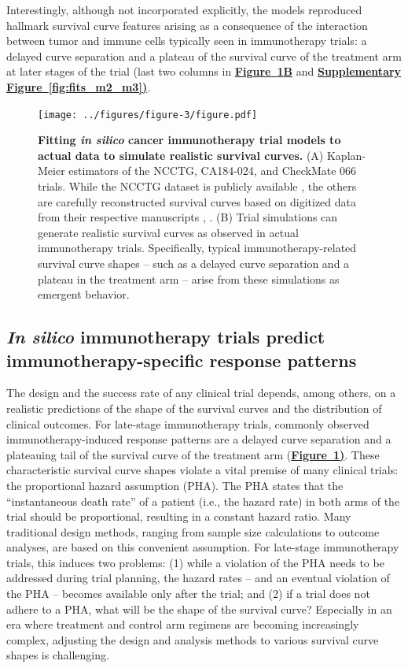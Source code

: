 \documentclass[a4paper,10pt]{article}
\newcommand{\myref}[2]{\hyperref[#1]{\bfseries Figure~\ref*{#1}#2}}
\newcommand{\mysupp}[2]{\hyperref[#1]{\bfseries Supplementary Figure~\ref*{#1}#2}}
\begin{document}
Interestingly, although not incorporated explicitly, the models reproduced hallmark survival
curve features arising as a consequence of the
interaction between tumor and immune cells typically seen in immunotherapy
trials: a delayed curve separation and a plateau of the survival curve of the
treatment arm at later stages of the trial 
(last two columns in \myref{fig:fig2}B and \mysupp{fig:fits_m2_m3}).

\begin{figure}

\texttt{[image: ../figures/figure-3/figure.pdf]}

\internallinenumbers\caption{
{\bfseries Fitting \emph{in silico} cancer immunotherapy trial models to actual data to simulate
	realistic survival curves.}
	(A) Kaplan-Meier estimators of the NCCTG, CA184-024, and CheckMate 066
	trials. While the NCCTG dataset is publicly available
	\cite{Loprinzi1994}, the others are carefully reconstructed survival
	curves based on digitized data from their respective manuscripts
	\cite{Maio2015}, \cite{Ascierto2019}. (B) Trial simulations can
	generate realistic survival curves as observed in actual
	immunotherapy trials. Specifically, typical immunotherapy-related
	survival curve shapes -- such as a delayed curve separation and a plateau
	in the treatment arm -- arise from these simulations as
	emergent behavior. 
	}
	\label{fig:fig2}
\end{figure}

\subsection*{\emph{In silico} immunotherapy trials predict immunotherapy-specific response patterns}

The design and the success rate of any clinical trial depends, among others, on
a realistic predictions of the shape of the survival curves and the distribution 
of clinical outcomes. For late-stage immunotherapy trials,
commonly observed immunotherapy-induced response patterns are a delayed curve
separation and a plateauing tail of the survival curve of the treatment arm
(\myref{fig:fig2}). These characteristic survival curve shapes violate a
vital premise of many clinical trials: the proportional hazard
assumption (PHA). The PHA states that the ``instantaneous death rate'' of a
patient (i.e., the hazard rate) in both arms of the trial should be
proportional, resulting in a constant hazard ratio. Many traditional design
methods, ranging from sample size calculations to outcome analyses, are based on
this convenient assumption. For late-stage immunotherapy trials, this induces
two problems: (1) while a violation of the PHA needs to be addressed during
trial planning, the hazard rates -- and an eventual violation of the PHA -- becomes
available only after the trial; and (2) if a trial does not 
adhere to a PHA, what will be the shape of the survival curve? Especially in
an era where treatment and control arm regimens are becoming increasingly
complex, adjusting the design and analysis methods to various survival curve shapes
is challenging.
\end{document}
